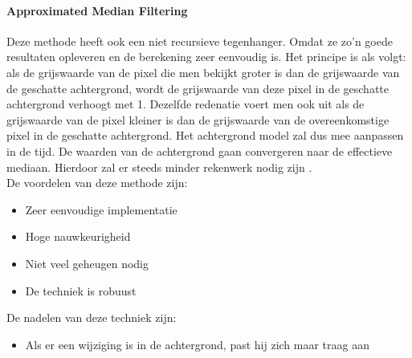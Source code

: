 \paragraph{Approximated Median Filtering}
\label{refAMF}
Deze methode heeft ook een niet recursieve tegenhanger. Omdat ze zo'n goede resultaten opleveren en de berekening zeer eenvoudig is. Het principe is als volgt: als de grijswaarde van de pixel die men bekijkt groter is dan de grijswaarde van de geschatte achtergrond, wordt de grijswaarde van deze pixel in de geschatte achtergrond verhoogt met 1. Dezelfde redenatie voert men ook uit als de grijswaarde van de pixel kleiner is dan de grijswaarde van de overeenkomstige pixel in de geschatte achtergrond. Het achtergrond model zal dus mee aanpassen in de tijd. De waarden van de achtergrond gaan convergeren naar de effectieve mediaan. Hierdoor zal er steeds minder rekenwerk nodig zijn \cite{bibVTS}.\\
De voordelen van deze methode zijn:
\begin{itemize}
	\item Zeer eenvoudige implementatie
	\item Hoge nauwkeurigheid
	\item Niet veel geheugen nodig
	\item De techniek is robuust
\end{itemize} 
De nadelen van deze techniek zijn:
\begin{itemize}
	\item Als er een wijziging is in de achtergrond, past hij zich maar traag aan
\end{itemize}

